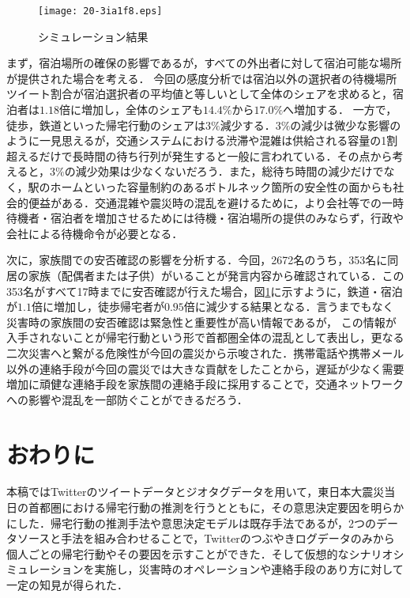 \documentclass[japanese]{jnlp_1.4}
\begin{document}
\begin{figure}[b]
\begin{center}
\texttt{[image: 20-3ia1f8.eps]}
\end{center}
\caption{シミュレーション結果}
\label{fig:simulation_result02}
\end{figure}

まず，宿泊場所の確保の影響であるが，すべての外出者に対して宿泊可能な場所が提供された場合を考える．
今回の感度分析では宿泊以外の選択者の待機場所ツイート割合が宿泊選択者の平均値と等しいとして全体のシェアを求めると，宿泊者は$1.18$倍に増加し，全体のシェアも$14.4 \%$から$17.0 \%$へ増加する．
一方で，徒歩，鉄道といった帰宅行動のシェアは$3\%$減少する．$3\%$の減少は微少な影響のように一見思えるが，交通システムにおける渋滞や混雑は供給される容量の1割超えるだけで長時間の待ち行列が発生すると一般に言われている．その点から考えると，$3\%$の減少効果は少なくないだろう．また，総待ち時間の減少だけでなく，駅のホームといった容量制約のあるボトルネック箇所の安全性の面からも社会的便益がある．交通混雑や震災時の混乱を避けるために，より会社等での一時待機者・宿泊者を増加させるためには待機・宿泊場所の提供のみならず，行政や会社による待機命令が必要となる．

次に，家族間での安否確認の影響を分析する．今回，2672名のうち，353名に同居の家族（配偶者または子供）がいることが発言内容から確認されている．この353名がすべて17時までに安否確認が行えた場合，図\ref{fig:simulation_result02}に示すように，鉄道・宿泊が$1.1$倍に増加し，徒歩帰宅者が$0.95$倍に減少する結果となる．言うまでもなく災害時の家族間の安否確認は緊急性と重要性が高い情報であるが，
この情報が入手されないことが帰宅行動という形で首都圏全体の混乱として表出し，更なる二次災害へと繋がる危険性が今回の震災から示唆された．携帯電話や携帯メール以外の連絡手段が今回の震災では大きな貢献をしたことから，遅延が少なく需要増加に頑健な連絡手段を家族間の連絡手段に採用することで，交通ネットワークへの影響や混乱を一部防ぐことができるだろう．


\section{おわりに}

本稿ではTwitterのツイートデータとジオタグデータを用いて，東日本大震災当日の首都圏における帰宅行動の推測を行うとともに，その意思決定要因を明らかにした．帰宅行動の推測手法や意思決定モデルは既存手法であるが，2つのデータソースと手法を組み合わせることで，Twitterのつぶやきログデータのみから個人ごとの帰宅行動やその要因を示すことができた．そして仮想的なシナリオシミュレーションを実施し，災害時のオペレーションや連絡手段のあり方に対して一定の知見が得られた．
\end{document}
